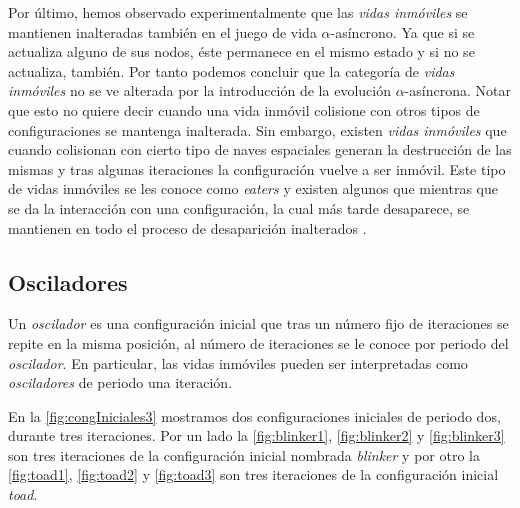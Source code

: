 \documentclass[../proyecto.tex]{memoir}
\begin{document}
Por último, hemos observado experimentalmente que las \textit{vidas inmóviles} se mantienen inalteradas también en el juego de vida $\alpha$-asíncrono. Ya que si se actualiza alguno de sus nodos, éste permanece en el mismo estado y si no se actualiza, también. Por tanto podemos concluir que la categoría de \textit{vidas inmóviles} no se ve alterada por la introducción de la evolución $\alpha$-asíncrona. Notar que esto no quiere decir cuando una vida inmóvil colisione con otros tipos de configuraciones se mantenga inalterada. Sin embargo, existen \textit{vidas inmóviles} que cuando colisionan con cierto tipo de naves espaciales generan la destrucción de las mismas y tras algunas iteraciones la configuración vuelve a ser inmóvil. Este tipo de vidas inmóviles se les conoce como \textit{eaters} y existen algunos que mientras que se da la interacción con una configuración, la cual más tarde desaparece, se mantienen en todo el proceso de desaparición inalterados \cite{eater}. 

\subsection{Osciladores}

Un \textit{oscilador} es una configuración inicial que tras un número fijo de iteraciones se repite en la misma posición, al número de iteraciones se le conoce por periodo del \textit{oscilador}. En particular, las vidas inmóviles pueden ser interpretadas como \textit{osciladores} de periodo una iteración.

En la \autoref{fig:congIniciales3} mostramos dos configuraciones iniciales de periodo dos, durante tres iteraciones. Por un lado la \autoref{fig:blinker1}, \autoref{fig:blinker2} y \autoref{fig:blinker3} son tres iteraciones de la configuración inicial nombrada \textit{blinker} y por otro la \autoref{fig:toad1}, \autoref{fig:toad2} y \autoref{fig:toad3} son tres iteraciones de la configuración inicial \textit{toad}.
\end{document}
